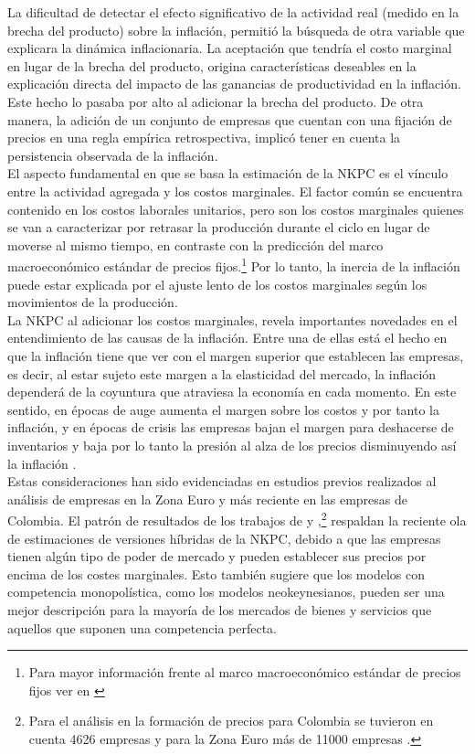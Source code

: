 La dificultad de detectar el efecto significativo de la actividad real (medido en la brecha del producto) sobre la inflación, permitió la búsqueda de otra variable que explicara la dinámica inflacionaria. La aceptación que tendría el costo marginal en lugar de la brecha del producto, origina características deseables en la explicación directa del impacto de las ganancias de productividad en la inflación. Este hecho lo pasaba por alto al adicionar la brecha del producto. De otra manera, la adición de un conjunto de empresas que cuentan con una fijación de precios en una regla empírica retrospectiva, implicó tener en cuenta la persistencia observada de la inflación.\\

El aspecto fundamental en que se basa la estimación de la NKPC es el vínculo entre la actividad agregada y los costos marginales. El factor común se encuentra contenido en los costos laborales unitarios, pero son los costos marginales quienes se van a caracterizar por retrasar la producción durante el ciclo en lugar de moverse al mismo tiempo, en contraste con la predicción del marco macroeconómico estándar de precios fijos.\footnote{Para mayor información frente al marco macroeconómico estándar de precios fijos ver en \cite{christiano1997sticky} }  Por lo tanto, la inercia de la inflación puede estar explicada por el ajuste lento de los costos marginales según los movimientos de la producción.\\

La NKPC al adicionar los costos marginales, revela importantes novedades en el entendimiento de las causas de la inflación. Entre una de ellas está el hecho en que la inflación tiene que ver con el margen superior que establecen las empresas, es decir, al estar sujeto este margen a la elasticidad del mercado, la inflación dependerá de la coyuntura que atraviesa la economía en cada momento. En este sentido, en épocas de auge aumenta el margen sobre los costos y por tanto la inflación, y en épocas de crisis las empresas bajan el margen para deshacerse de inventarios y baja por lo tanto la presión al alza de los precios disminuyendo así la inflación \citep{galvis2010estimacion}.\\

Estas consideraciones han sido evidenciadas en estudios previos realizados al análisis de empresas en la Zona Euro y más reciente en las empresas de Colombia. El patrón de resultados de los trabajos de  \cite{fabiani2005pricing} y \cite{misas2009formacion},\footnote{Para el análisis en la formación de precios para Colombia se tuvieron en cuenta 4626 empresas \citep{misas2009formacion} y para la Zona Euro más de 11000 empresas \citep{fabiani2005pricing}.}  respaldan la reciente ola de estimaciones de versiones híbridas de la NKPC, debido a que las empresas tienen algún tipo de poder de mercado y pueden establecer sus precios por encima de los costes marginales. Esto también sugiere que los modelos con competencia monopolística, como los modelos neokeynesianos, pueden ser una mejor descripción para la mayoría de los mercados de bienes y servicios que aquellos que suponen una competencia perfecta. \\

